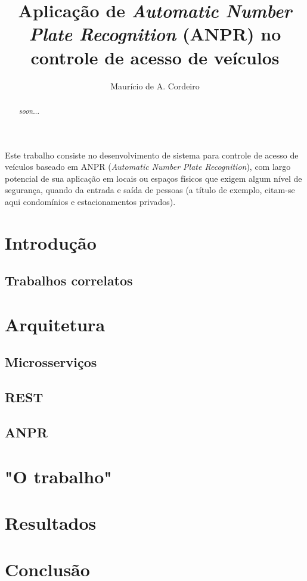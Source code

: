 \documentclass[12pt]{article}
\title{Aplicação de \textit{Automatic Number Plate Recognition} (ANPR) no controle de acesso de veículos}
\author{Maurício de A. Cordeiro\inst{1} }
\begin{document}
 

\maketitle

\begin{abstract}
  \textit{soon...}
\end{abstract}
     
\begin{resumo} 
 Este trabalho consiste no desenvolvimento de sistema para controle de acesso de veículos baseado em ANPR (\textit{Automatic Number Plate Recognition}), com largo potencial de sua aplicação em locais ou espaços físicos que exigem algum nível de segurança, quando da entrada e saída de pessoas (a título de exemplo, citam-se aqui condomínios e estacionamentos privados). 
\end{resumo}

\section{Introdução}

\subsection{Trabalhos correlatos}


\section{Arquitetura}

\cite{viggiato2018microservices}



\subsection{Microsserviços}

\subsection{REST}

\subsection{ANPR}

\section{"O trabalho"}


\section{Resultados}


\section{Conclusão}





\end{document}

